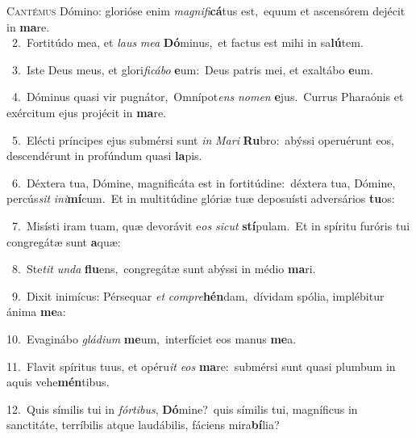\lettrine{\initial\textcolor{\initialcolor}{C}}{antémus} Dómino: glorióse enim \textit{ma}\-\textit{gni}\textit{fi}\textbf{cá}tus est,~\star equum et ascensórem dejécit in \textbf{ma}\-re.\\
{\numbfont\textcolor{\numbcolor}{~2.}}~Fortitúdo mea, et \textit{laus} \textit{me}\-\textit{a} \textbf{Dó}\-minus,~\star et factus est mihi in sa\-\textbf{lú}\-tem.\par
{\numbfont\textcolor{\numbcolor}{~3.}}~Iste Deus meus, et glori\-\textit{fi}\-\textit{cá}\textit{bo} \textbf{e}\-um:~\star Deus patris mei, et exaltábo \textbf{e}\-um.\par
{\numbfont\textcolor{\numbcolor}{~4.}}~Dóminus quasi vir pugnátor,~\dagger Omnípot\textit{ens} \textit{no}\-\textit{men} \textbf{e}\-jus.~\star Currus Pharaónis et exércitum ejus projécit in \textbf{ma}\-re.\par
{\numbfont\textcolor{\numbcolor}{~5.}}~Elécti príncipes ejus submérsi sunt \textit{in} \textit{Ma}\-\textit{ri} \textbf{Ru}\-bro:~\star abýssi operuérunt eos, descendérunt in profúndum quasi \textbf{la}\-pis.\par
{\numbfont\textcolor{\numbcolor}{~6.}}~Déxtera tua, Dómine, magnificáta est in fortitúdine:~\dagger déxtera tua, Dómine, percús\textit{sit} \textit{in}\-\textit{i}\textbf{mí}cum.~\star Et in multitúdine glóriæ tuæ deposuísti adversários \textbf{tu}\-os:\par
{\numbfont\textcolor{\numbcolor}{~7.}}~Misísti iram tuam, quæ devorávit e\textit{os} \textit{sic}\-\textit{ut} \textbf{stí}\-pulam.~\star Et in spíritu furóris tui congregátæ sunt \textbf{a}\-quæ:\par
{\numbfont\textcolor{\numbcolor}{~8.}}~Ste\textit{tit} \textit{un}\-\textit{da} \textbf{flu}\-ens,~\star congregátæ sunt abýssi in médio \textbf{ma}\-ri.\par
{\numbfont\textcolor{\numbcolor}{~9.}}~Dixit inimícus: Pérsequar \textit{et} \textit{com}\-\textit{pre}\textbf{hén}dam,~\star dívidam spólia, implébitur ánima \textbf{me}\-a:\par
{\numbfont\textcolor{\numbcolor}{10.}}~Evaginábo \textit{glá}\-\textit{di}\textit{um} \textbf{me}\-um,~\star interfíciet eos manus \textbf{me}\-a.\par
{\numbfont\textcolor{\numbcolor}{11.}}~Flavit spíritus tuus, et opéru\textit{it} \textit{e}\-\textit{os} \textbf{ma}\-re:~\star submérsi sunt quasi plumbum in aquis vehe\-\textbf{mén}\-tibus.\par
{\numbfont\textcolor{\numbcolor}{12.}}~Quis símilis tui in \textit{fór}\-\textit{ti}\textit{bus}, \textbf{Dó}\-mine?~\star quis símilis tui, magníficus in sanctitáte, terríbilis atque laudábilis, fáciens mira\-\textbf{bí}\-lia?\par
